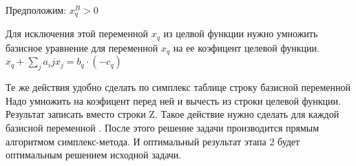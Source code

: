 Предположим: $x^B_q > 0$

Для исключения этой переменной $x_q$ из целвой функции нужно умножить базисное уравнение для переменной  $x_q$ на ее коэфицент целевой функции.\\
$x_q + \sum\limits_{j}{a_ij x_j} = b_q \cdot (-c_q)$

Те же действия удобно сделать по симплекс таблице
строку базисной переменной Надо умножить на коэфицент перед ней и вычесть из строки целевой функции. Результат записать вместо строки Z.
Такое действие нужно сделать для каждой базисной переменной .
После этого решение задачи производится прямым алгоритмом симплекс-метода.
И оптимальный результат этапа 2 будет оптимальным решением исходной задачи.
